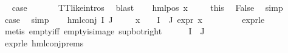 \begin{isabellebody}
\ \isamarkupfalse%
\ {\isacharquery}{\kern0pt}case\ \isanewline
\ \ \ \ \isamarkupfalse%
\ TT{\isacharunderscore}{\kern0pt}like{\isachardot}{\kern0pt}intros{\isacharparenleft}{\kern0pt}{}{\isacharparenright}{\kern0pt}\ \isamarkupfalse%
\ blast\isanewline
{}\isamarkupfalse%
\isanewline
\ \ \isamarkupfalse%
\ {\isacharparenleft}{\kern0pt}hml{\isacharunderscore}{\kern0pt}pos\ x{}\ {\isasymphi}{\isacharparenright}{\kern0pt}\isanewline
\ \ \isamarkupfalse%
\ this{\isacharparenleft}{\kern0pt}{}{\isacharparenright}{\kern0pt}\ \isamarkupfalse%
\ False\ \isamarkupfalse%
\ simp\isanewline
\ \ \isamarkupfalse%
\ \isamarkupfalse%
\ {\isacharquery}{\kern0pt}case\ \isamarkupfalse%
\ simp\isanewline
{}\isamarkupfalse%
\isanewline
\ \ \isamarkupfalse%
\ {\isacharparenleft}{\kern0pt}hml{\isacharunderscore}{\kern0pt}conj\ I\ J\ {\isasymPhi}{\isacharparenright}{\kern0pt}\isanewline
\ \ \isamarkupfalse%
\ {\isachardoublequoteopen}{\isasymforall}x\ {\isasymin}\ {\isasymPhi}\ {\isacharbackquote}{\kern0pt}\ {\isacharparenleft}{\kern0pt}I\ {\isasymunion}\ J{\isacharparenright}{\kern0pt}{\isachardot}{\kern0pt}\ expr{\isacharunderscore}{\kern0pt}{}\ x\ {\isasymle}\ {}{\isachardoublequoteclose}\ \isanewline
\ \ \ \ \isamarkupfalse%
\ expr{\isacharunderscore}{\kern0pt}{}{\isacharunderscore}{\kern0pt}le{\isacharunderscore}{\kern0pt}{}\ \isanewline
\ \ \ \ \isamarkupfalse%
\ {\isacharparenleft}{\kern0pt}metis\ empty{\isacharunderscore}{\kern0pt}iff\ empty{\isacharunderscore}{\kern0pt}is{\isacharunderscore}{\kern0pt}image\ sup{\isacharunderscore}{\kern0pt}bot{\isacharunderscore}{\kern0pt}right{\isacharparenright}{\kern0pt}\isanewline
\ \ \isamarkupfalse%
\ {\isachardoublequoteopen}{\isasymPhi}\ {\isacharbackquote}{\kern0pt}\ {\isacharparenleft}{\kern0pt}I\ {\isasymunion}\ J{\isacharparenright}{\kern0pt}\ {\isacharequal}{\kern0pt}\ {\isacharbraceleft}{\kern0pt}{\isacharbraceright}{\kern0pt}{\isachardoublequoteclose}\ \isanewline
\ \ \ \ \isamarkupfalse%
\ expr{\isacharunderscore}{\kern0pt}{}{\isacharunderscore}{\kern0pt}le{\isacharunderscore}{\kern0pt}{}\ hml{\isacharunderscore}{\kern0pt}conj{\isachardot}{\kern0pt}prems{\isacharparenleft}{\kern0pt}{}{\isacharparenright}{\kern0pt}\ \isamarkupfalse%

\end{isabellebody}
